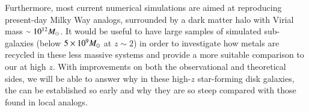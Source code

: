 Furthermore, most current numerical simulations are aimed at reproducing present-day Milky
Way analogs, surrounded by a dark matter halo with Virial mass $\sim10^{12}M_\odot$. It would
be useful to have large samples of simulated sub-\Lstar galaxies (\Mstar below
$5\times10^9M_\odot$ at $z\sim2$) in order to investigate how metals are recycled in these less
massive systems and provide a more suitable comparison to our \mgms at high $z$.  With
improvements on both the observational and theoretical sides, we will be able to answer why
in these high-$z$ star-forming disk galaxies, the \mgs can be established so early and why
they are so steep compared with those found in local analogs.




